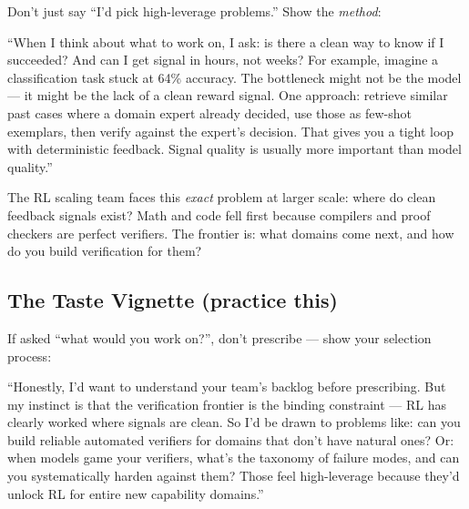 Don't just say ``I'd pick high-leverage problems.'' Show the \textit{method}:

\begin{sayit}
``When I think about what to work on, I ask: is there a clean way to know if I succeeded? And can I get signal in hours, not weeks? For example, imagine a classification task stuck at 64\% accuracy. The bottleneck might not be the model --- it might be the lack of a clean reward signal. One approach: retrieve similar past cases where a domain expert already decided, use those as few-shot exemplars, then verify against the expert's decision. That gives you a tight loop with deterministic feedback. Signal quality is usually more important than model quality.''
\end{sayit}

\begin{whyanthro}
The RL scaling team faces this \textit{exact} problem at larger scale: where do clean feedback signals exist? Math and code fell first because compilers and proof checkers are perfect verifiers. The frontier is: what domains come next, and how do you build verification for them?
\end{whyanthro}

\subsection{The Taste Vignette (practice this)}

If asked ``what would you work on?'', don't prescribe --- show your selection process:

\begin{sayit}
``Honestly, I'd want to understand your team's backlog before prescribing. But my instinct is that the verification frontier is the binding constraint --- RL has clearly worked where signals are clean. So I'd be drawn to problems like: can you build reliable automated verifiers for domains that don't have natural ones? Or: when models game your verifiers, what's the taxonomy of failure modes, and can you systematically harden against them? Those feel high-leverage because they'd unlock RL for entire new capability domains.''
\end{sayit}

